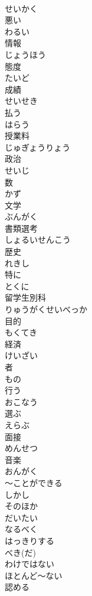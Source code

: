 \documentclass[8pt]{extreport}
\begin{document}
\begin{CJK}{UTF8}{min}
\\	せいかく
\\	悪い	
\\	わるい
\\	情報	
\\	じょうほう
\\	態度	
\\	たいど
\\	成績	
\\	せいせき
\\	払う	
\\	はらう
\\	授業料	
\\	じゅぎょうりょう
\\	政治	
\\	せいじ
\\	数	
\\	かず
\\	文学	
\\	ぶんがく
\\	書類選考	
\\	しょるいせんこう
\\	歴史	
\\	れきし
\\	特に	
\\	とくに
\\	留学生別科	
\\	りゅうがくせいべっか
\\	目的	
\\	もくてき
\\	経済	
\\	けいざい
\\	者	
\\	もの
\\	行う	
\\	おこなう
\\	選ぶ	
\\	えらぶ
\\	面接	
\\	めんせつ
\\	音楽	
\\	おんがく
\\	～ことができる	
\\	しかし	
\\	そのほか	
\\	だいたい	
\\	なるべく	
\\	はっきりする	
\\	べき(だ)	
\\	わけではない	
\\	ほとんど～ない	
\\	認める	

\end{CJK}
\end{document}
